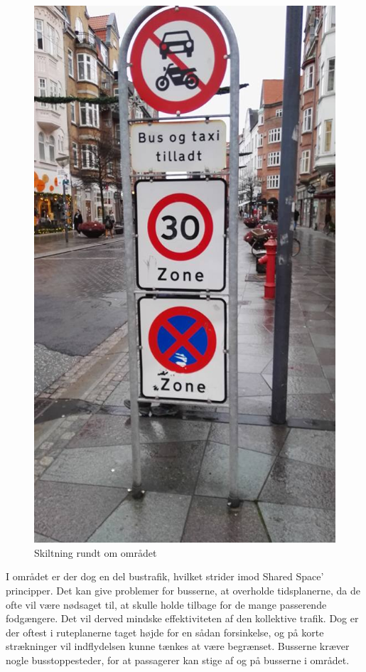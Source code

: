 \begin{figure}[htbp]
   \centering
   \begin{adjustbox}{max width=\textwidth}
     \includegraphics[scale=0.2]{figures/Billederogfigur/skiltning.jpg}
  \end{adjustbox}
   \caption{Skiltning rundt om området}
   \label{fig:Skiltning}
 \end{figure}

I området er der dog en del bustrafik, hvilket strider imod Shared Space’ principper. Det kan give problemer for busserne, at overholde tidsplanerne, da de ofte vil være nødsaget til, at skulle holde tilbage for de mange passerende fodgængere. Det vil derved mindske effektiviteten af den kollektive trafik. Dog er der oftest i ruteplanerne taget højde for en sådan forsinkelse, og på korte strækninger vil indflydelsen kunne tænkes at være begrænset. Busserne kræver nogle busstoppesteder, for at passagerer kan stige af og på busserne i området.


